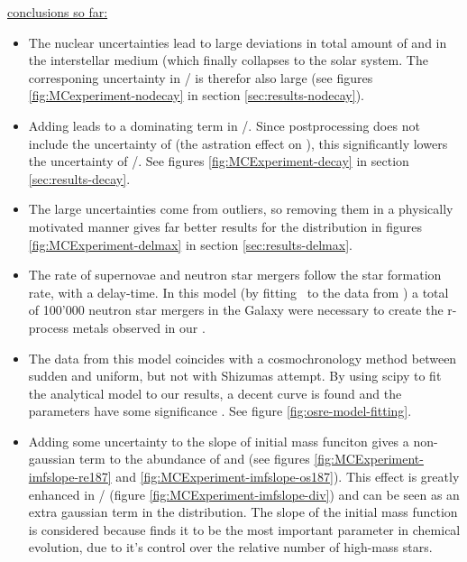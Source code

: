 \iffalse
{}
\underline{conclusions so far:}
\begin{itemize}
\item The nuclear uncertainties lead to large deviations in total amount of  and  in the interstellar medium (which finally collapses to the solar system. The corresponing uncertainty in / is therefor also large (see figures \ref{fig:MCexperiment-nodecay} in section \ref{sec:results-nodecay}).
\item Adding \betadecay leads to a dominating term in /. Since postprocessing does not include the uncertainty of \betadecay (the astration effect on ), this significantly lowers the uncertainty of /. See figures \ref{fig:MCExperiment-decay} in section \ref{sec:results-decay}.
\item The large uncertainties come from outliers, so removing them in a physically motivated manner gives far better results for the distribution in figures \ref{fig:MCExperiment-delmax} in section \ref{sec:results-delmax}.
\item The rate of supernovae and neutron star mergers follow the star formation rate, with a delay-time. In this model (by fitting \omegamodel\ to the data from \eris) a total of 100'000 neutron star mergers in the Galaxy were necessary to create the r-process metals observed in our \sos.
\item The data from this model coincides with a cosmochronology method between sudden and uniform, but not with Shizumas attempt. By using scipy to fit the analytical model to our results, a decent curve is found and the parameters have some significance . See figure \ref{fig:osre-model-fitting}.
\item Adding some uncertainty to the slope of initial mass funciton gives a non-gaussian term to the abundance of  and  (see figures \ref{fig:MCExperiment-imfslope-re187} and \ref{fig:MCExperiment-imfslope-os187}). This effect is greatly enhanced in / (figure \ref{fig:MCExperiment-imfslope-div}) and can be seen as an extra gaussian term in the distribution. The slope of the initial mass function is considered because  finds it to be the most important parameter in chemical evolution, due to it's control over the relative number of high-mass stars.

\end{itemize}
